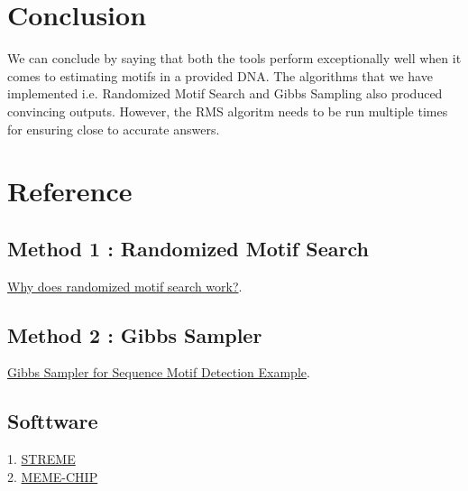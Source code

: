 \documentclass{report}
\begin{document}
\chapter{Conclusion}
We can conclude by saying that both the tools perform exceptionally well when it comes to estimating motifs in a provided DNA. The algorithms that we have implemented i.e. Randomized Motif Search and Gibbs Sampling also produced convincing outputs. However, the RMS algoritm needs to be run multiple times for ensuring close to accurate answers.

\chapter{Reference}

\section{Method 1 : Randomized Motif Search}
\href{https://bioinformatics.stackexchange.com/questions/18240/why-does-randomized-motif-search-work?fbclid=IwAR0LGdW5u8DrMA_ZjjjkNqPFsded6p7dND9Ek6C-15-Y9R6CTFu9CzbxKy4}{Why does randomized motif search work?}. 

\section{Method 2 : Gibbs Sampler}
\href{https://youtu.be/vupAgqunSGM?si=pO8DOJ172PhKR78w}{Gibbs Sampler for Sequence Motif Detection Example}. 

\section{Softtware}
1. \href{https://meme-suite.org/meme/tools/streme}{STREME} \\
2. \href{https://meme-suite.org/meme/tools/meme-chip}{MEME-CHIP}
\end{document}
